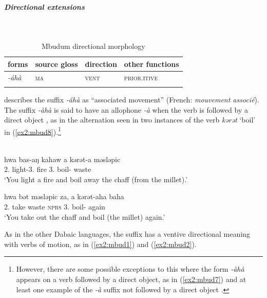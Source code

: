 \subparagraph{Directional extensions}~

\begin{table}[H]
\caption{Mbudum directional morphology}
\label{tab:mbud}
\begin{tabular}{llll} %
	\lsptoprule
	forms & source gloss & direction  & other functions  \\ %
	\midrule
	\textit{-áhà}  &  \textsc{ma}  &   \textsc{vent} &   \textsc{prior.itive}  \\
	\lspbottomrule
\end{tabular}
\end{table} 

\noindent
\citet{fobakayyangPhonologieMorphologieSyntaxe2021} describes the suffix \textit{-áhà} as ``associated movement'' (French: \textit{mouvement associé}). The suffix \textit{-àhà} is said to have an allophone \textit{-à} when the verb is followed by a direct object \citep[292]{fobakayyangPhonologieMorphologieSyntaxe2021}, as in the alternation seen in two instances of the verb \textit{kərət} ‘boil’ in (\ref{ex2:mbud8}).\footnote{However, there are some possible exceptions to this where the form \textit{-àhà} appears on a verb followed by a direct object, as in (\ref{ex2:mbud7}) \citep[see also][175, 238]{fobakayyangPhonologieMorphologieSyntaxe2021} and at least one example of the \textit{-à} suffix not followed by a direct object \citep[265]{fobakayyangPhonologieMorphologieSyntaxe2021}.}

\ea\label{ex2:mbud8}
 \\
\ea \label{ex2:mbud8a}
\gll  hwa	bas-aŋ	kahaw	a	kərət-a	məsləpic \\
2.	light-3.	fire	3.	boil-	waste \\
\glt `You light a fire and boil away the chaff (from the millet).'

\ex \label{ex2:mbud8b}
\gll  hwa	bət	məsləpic	za,	a	kərət-aha	baha \\
2.	take	waste	\textsc{nprs}	3.	boil-	again \\
\glt `You take out the chaff and boil (the millet) again.'
\z 
\z 

As in the other Dabaic languages, the suffix has a ventive directional meaning with verbs of motion, as in (\ref{ex2:mbud1}) and (\ref{ex2:mbud2}). 

